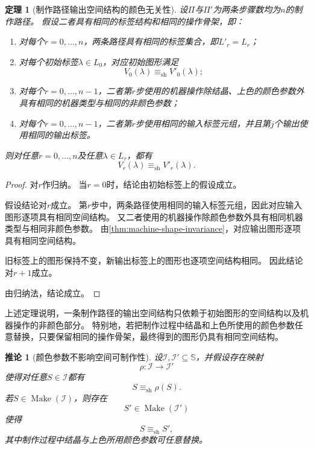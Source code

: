\documentclass[UTF8,fontset=none]{ctexart}
\theoremstyle{cnthm}
\newtheorem{theorem}{定理}[section]
\newtheorem{corollary}{推论}[section]
\begin{document}
			\begin{theorem}[制作路径输出空间结构的颜色无关性]\label{thm:production-path-color-independence}
				设$\Pi$与$\Pi'$为两条步骤数均为$n$的制作路径。
				假设二者具有相同的标签结构和相同的操作骨架，即：
				\begin{enumerate}
					\item 对每个$r=0,\dots,n$，两条路径具有相同的标签集合，即$L'_r=L_r$；
					\item 对每个初始标签$\lambda\in L_0$，对应初始图形满足
					$$
					V_0(\lambda)\equiv_{\mathrm{sh}}V'_0(\lambda);
					$$
					\item 对每个$r=0,\dots,n-1$，二者第$r$步使用的机器操作除结晶、上色的颜色参数外具有相同的机器类型与相同的非颜色参数；
					\item 对每个$r=0,\dots,n-1$，二者第$r$步使用相同的输入标签元组，并且第$j$个输出使用相同的输出标签。
				\end{enumerate}
				则对任意$r=0,\dots,n$及任意$\lambda\in L_r$，都有
				$$
				V_r(\lambda)\equiv_{\mathrm{sh}}V'_r(\lambda).
				$$
			\end{theorem}
			
			\begin{proof}
				
				对$r$作归纳。
				当$r=0$时，结论由初始标签上的假设成立。
				
				假设结论对$r$成立。
				第$r$步中，两条路径使用相同的输入标签元组，因此对应输入图形逐项具有相同空间结构。
				又二者使用的机器操作除颜色参数外具有相同机器类型与相同非颜色参数。
				由\cref{thm:machine-shape-invariance}，对应输出图形逐项具有相同空间结构。
				
				旧标签上的图形保持不变，新输出标签上的图形也逐项空间结构相同。
				因此结论对$r+1$成立。
				
				由归纳法，结论成立。
			\end{proof}
			
			上述定理说明，一条制作路径的输出空间结构只依赖于初始图形的空间结构以及机器操作的非颜色部分。
			特别地，若把制作过程中结晶和上色所使用的颜色参数任意替换，只要保留相同的操作骨架，最终得到的图形仍具有相同空间结构。
			
			\begin{corollary}[颜色参数不影响空间可制作性]\label{cor:make-shape-color-independence}
				设$\mathcal{I},\mathcal{I}'\subseteq\mathbb{S}$，并假设存在映射
				$$
				\rho:\mathcal{I}\to\mathcal{I}'
				$$
				使得对任意$S\in\mathcal{I}$都有
				$$
				S\equiv_{\mathrm{sh}}\rho(S).
				$$
				若$S\in\operatorname{Make}(\mathcal{I})$，则存在
				$$
				S'\in\operatorname{Make}(\mathcal{I}')
				$$
				使得
				$$
				S\equiv_{\mathrm{sh}}S',
				$$
				其中制作过程中结晶与上色所用颜色参数可任意替换。
			\end{corollary}
			
\end{document}
